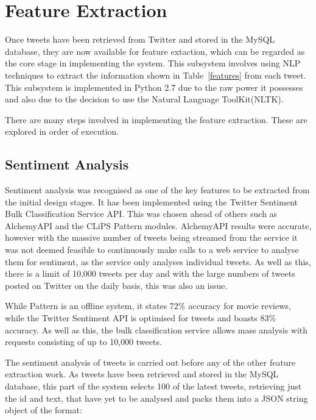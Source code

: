 
\section{Feature Extraction}
Once tweets have been retrieved from Twitter and stored in the MySQL database, they are now available for feature extaction, which can be regarded as the core stage in implementing the system. This subsystem involves using NLP techniques to extract the information shown in Table~\ref{features} from each tweet. This subsystem is implemented in Python 2.7 due to the raw power it possesses and also due to the decision to use the Natural Language ToolKit(NLTK)\cite{NLTK}.

There are many steps involved in implementing the feature extraction. These are explored in order of execution.

\subsection{Sentiment Analysis}
Sentiment analysis was recognised as one of the key features to be extracted from the initial design stages. It has been implemented using the Twitter Sentiment Bulk Classification Service API. This was chosen ahead of others such as AlchemyAPI\cite{alchemyapi} and the CLiPS Pattern modules. AlchemyAPI results were accurate, however with the massive number of tweets being streamed from the service it was not deemed feasible to continuously make calls to a web service to analyse them for sentiment, as the service only analyses individual tweets. As well as this, there is a limit of 10,000 tweets per day and with the large numbers of tweets posted on Twitter on the daily basis, this was also an issue.

While Pattern is an offline system, it states 72\% accuracy for movie reviews\cite{pattern}, while the Twitter Sentiment API is optimised for tweets and boasts 83\% accuracy\cite{Go_Bhayani_Huang_2009}. As well as this, the bulk classification service allows mass analysis with requests consisting of up to 10,000 tweets.

The sentiment analysis of tweets is carried out before any of the other feature extraction work. As tweets have been retrieved and stored in the MySQL database, this part of the system selects 100 of the latest tweets, retrieving just the id and text, that have yet to be analysed and packs them into a JSON string object of the format:

